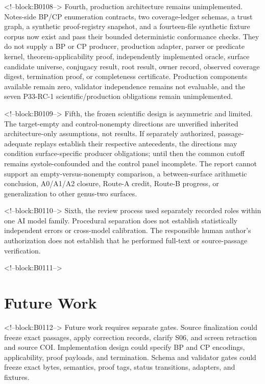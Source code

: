 \documentclass[11pt,a4paper]{article}
\begin{document}
<!--block:B0108-->
Fourth, production architecture remains unimplemented. Notes-side BP/CP enumeration contracts, two coverage-ledger schemas, a trust graph, a synthetic proof-registry snapshot, and a fourteen-file synthetic fixture corpus now exist and pass their bounded deterministic conformance checks. They do not supply a BP or CP producer, production adapter, parser or predicate kernel, theorem-applicability proof, independently implemented oracle, surface candidate universe, conjugacy result, root result, owner record, observed coverage digest, termination proof, or completeness certificate. Production components available remain zero, validator independence remains not evaluable, and the seven P33-RC-1 scientific/production obligations remain unimplemented.

<!--block:B0109-->
Fifth, the frozen scientific design is asymmetric and limited. The target-empty and control-nonempty directions are unverified inherited architecture-only assumptions, not results. If separately authorized, passage-adequate replays establish their respective antecedents, the directions may condition surface-specific producer obligations; until then the common cutoff remains systole-confounded and the control panel incomplete. The report cannot support an empty-versus-nonempty comparison, a between-surface arithmetic conclusion, A0/A1/A2 closure, Route-A credit, Route-B progress, or generalization to other genus-two surfaces.

<!--block:B0110-->
Sixth, the review process used separately recorded roles within one AI model family. Procedural separation does not establish statistically independent errors or cross-model calibration. The responsible human author's authorization does not establish that he performed full-text or source-passage verification.

<!--block:B0111-->
\hypertarget{future-work}{%
\section{Future Work}\label{future-work}}

<!--block:B0112-->
Future work requires separate gates. Source finalization could freeze exact passages, apply correction records, clarify S06, and screen retraction and source COI. Implementation design could specify BP and CP encodings, applicability, proof payloads, and termination. Schema and validator gates could freeze exact bytes, semantics, proof tags, status transitions, adapters, and fixtures.
\end{document}
